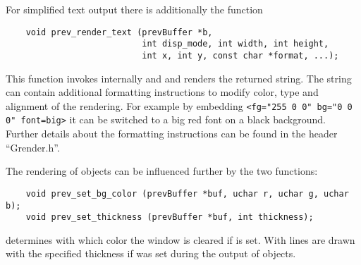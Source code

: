 For simplified text output there is additionally the function
\begin{small}
\linespread{0.9}
\begin{verbatim}
    void prev_render_text (prevBuffer *b,
                           int disp_mode, int width, int height,
                           int x, int y, const char *format, ...);
\end{verbatim}
\end{small}
This function invokes  internally and and renders
the returned string. The string can contain additional
formatting instructions to modify color, type and alignment
of the rendering. For example by embedding
\verb|<fg="255 0 0" bg="0 0 0" font=big>| it can be switched to a
big red font on a black background. Further details about the
formatting instructions can be found in the header ``Grender.h''.

The rendering of objects can be influenced further by the two
functions:
\begin{small}
\linespread{0.9}
\begin{verbatim}
    void prev_set_bg_color (prevBuffer *buf, uchar r, uchar g, uchar b);
    void prev_set_thickness (prevBuffer *buf, int thickness);
\end{verbatim}
\end{small}
 determines with which color the window
is cleared if  is set. With
 lines are drawn with the specified
thickness if  was set during the output of
objects.

